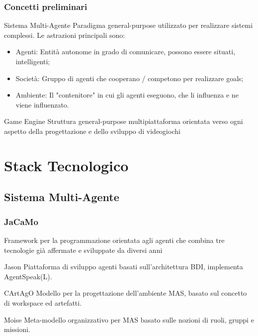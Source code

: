 \documentclass[handout]{beamer}\mode<presentation>{\usetheme{AMSCesenaBleu}}
\begin{document}
\begin{frame}
\frametitle[Introduzione e stato dell'arte]{Concetti preliminari}
\begin{block}{Sistema Multi-Agente}
Paradigma general-purpose utilizzato per realizzare sistemi complessi. Le astrazioni principali sono:
\begin{itemize}
    \item Agenti: Entità autonome in grado di comunicare, possono essere situati, intelligenti;
    \item Società: Gruppo di agenti che cooperano / competono per realizzare goals;
    \item Ambiente: Il "contenitore" in cui gli agenti eseguono, che li influenza e ne viene influenzato.
\end{itemize}
\end{block}

\begin{block}{Game Engine}
Struttura general-purpose multipiattaforma orientata verso ogni aspetto della progettazione e dello sviluppo di videogiochi
\end{block}

\end{frame}

\section{Stack Tecnologico}

\subsection{Sistema Multi-Agente}

\begin{frame}
\frametitle[Stack Tecnologico]{JaCaMo}

Framework per la programmazione orientata agli agenti che combina tre tecnologie già affermate e sviluppate da diversi anni

\begin{block}{Jason}
Piattaforma di sviluppo agenti basati sull'architettura BDI, implementa AgentSpeak(L).
\end{block}

\begin{block}{CArtAgO}
Modello per la progettazione dell'ambiente MAS, basato sul concetto di workspace ed artefatti.
\end{block}

\begin{block}{Moise}
Meta-modello organizzativo per MAS basato sulle nozioni di ruoli, gruppi e missioni.
\end{block}

\end{frame}
\end{document}
